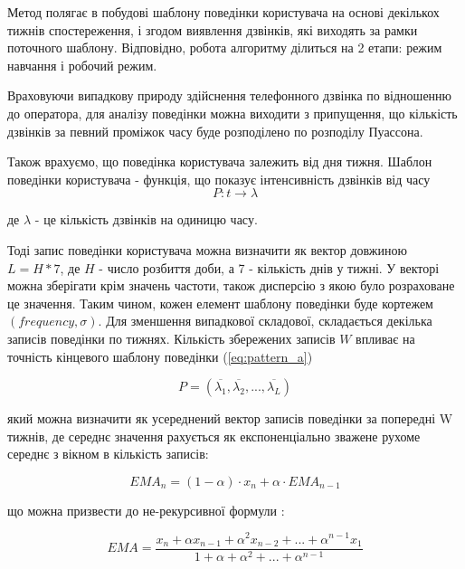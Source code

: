 Метод \cite{rader2014cdr} полягає в побудові шаблону поведінки користувача на основі декількох тижнів спостереження, і згодом виявлення дзвінків, які виходять за рамки поточного шаблону. Відповідно, робота алгоритму ділиться на 2 етапи: режим навчання і робочий режим.

Враховуючи випадкову природу здійснення телефонного дзвінка по відношенню до оператора, для аналізу поведінки можна виходити з припущення, що кількість дзвінків за певний проміжок часу буде розподілено по розподілу Пуассона.

Також врахуємо, що поведінка користувача залежить від дня тижня. Шаблон поведінки користувача - функція, що показує інтенсивність дзвінків від часу
\begin{equation}\label{eq:pattern_a}P: t \rightarrow \lambda \end{equation}

\begin{ESKDexplanation}
  \item де $\lambda$ - це кількість дзвінків на одиницю часу.
\end{ESKDexplanation}

Тоді запис поведінки користувача можна визначити як вектор довжиною $L = H * 7$, де $H$ - число розбиття доби, а 7 - кількість днів у тижні. У векторі можна зберігати крім значень частоти, також дисперсію з якою було розраховане це значення. Таким чином, кожен елемент шаблону поведінки буде кортежем $(frequency, \sigma)$. Для зменшення випадкової складової, складається декілька записів поведінки по тижнях. Кількість збережених записів $W$ впливає на точність кінцевого шаблону поведінки (\ref{eq:pattern_a})

\begin{equation}\label{eq:pattern_a2}P = (\overline{\lambda_1}, \overline{\lambda_2}, ..., \overline{\lambda_L}) \end{equation}

який можна визначити як усереднений вектор записів поведінки за попередні W тижнів, де середнє значення рахується як експоненціально зважене рухоме середнє з вікном в кількість записів:

\begin{equation}\label{eq:ema}EMA_n = (1-\alpha) \cdot x_n + \alpha \cdot EMA_{n-1} \end{equation}

що можна призвести до не-рекурсивної формули \cite{cargal1988discrete}:

\begin{equation}\label{eq:ema_nonrecursive}EMA = \frac{{x}_{n} + \alpha {x}_{n -1} + {\alpha} ^ {2} {x}_{n -2} +...+ {\alpha} ^ {n -1} {x}_{1}}{1+ \alpha + {\alpha} ^ {2} +...+ {\alpha} ^ {n -1}} \end{equation}

